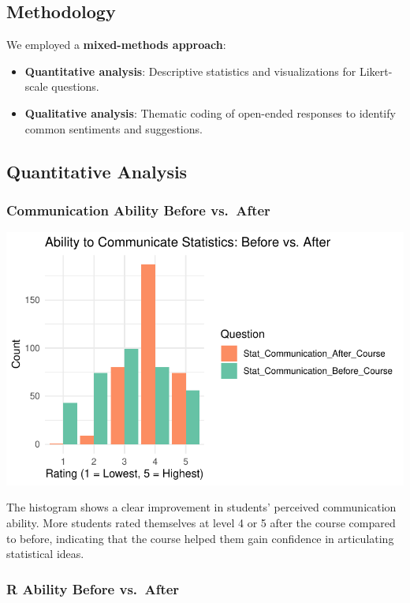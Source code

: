 \documentclass[
  letterpaper,
  DIV=11,
  numbers=noendperiod]{scrartcl}
\providecommand{\tightlist}{%
  \setlength{\itemsep}{0pt}\setlength{\parskip}{0pt}}\usepackage{longtable,booktabs,array}
\begin{document}
\subsection{Methodology}\label{methodology}

We employed a \textbf{mixed-methods approach}:

\begin{itemize}
\tightlist
\item
  \textbf{Quantitative analysis}: Descriptive statistics and
  visualizations for Likert-scale questions.
\item
  \textbf{Qualitative analysis}: Thematic coding of open-ended responses
  to identify common sentiments and suggestions.
\end{itemize}

\subsection{Quantitative Analysis}\label{quantitative-analysis}

\subsubsection{Communication Ability Before
vs.~After}\label{communication-ability-before-vs.-after}

\includegraphics{paper_files/figure-pdf/unnamed-chunk-3-1.pdf}

The histogram shows a clear improvement in students' perceived
communication ability. More students rated themselves at level 4 or 5
after the course compared to before, indicating that the course helped
them gain confidence in articulating statistical ideas.

\subsubsection{R Ability Before
vs.~After}\label{r-ability-before-vs.-after}
\end{document}
